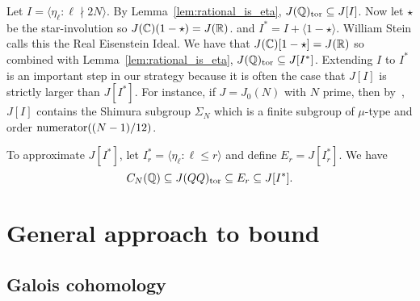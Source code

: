 Let $I= \langle \eta_\ell:\ell\nmid 2N \rangle$. By
Lemma~\ref{lem:rational_is_eta}, $J(\mathbb{Q})_{\mathrm{tor}}\subseteq J[I]$. Now let $\star$
be the star-involution so $J(\mathbb{C})(1-\star)=J(\mathbb{R})$. and $I^*=I +
\langle 1-\star \rangle$. William Stein calls this the Real Eisenstein Ideal.
We have that $J(\mathbb{C})[1-\star]=J(\mathbb{R})$ so combined with
Lemma~\ref{lem:rational_is_eta}, $J(\mathbb{Q})_{\mathrm{tor}}\subseteq J[I^*]$. Extending $I$
to $I^*$ is an important step in our strategy because it is often the case that
$J[I]$ is strictly larger than $J[I^*]$. For instance, if $J=J_0(N)$ with $N$
prime, then by~\cite[Cor. 16.3]{mazur:eisenstein}, $J[I]$ contains the Shimura
subgroup $\Sigma_N$ which is a finite subgroup of $\mu$-type and order
$\operatorname{numerator}((N-1)/12)$.

To approximate $J[I^*]$, let $I_r ^* = \langle \eta_\ell:\ell\leq r \rangle$
and define $E_r = J[I_r ^*]$.
We have
\begin{equation}%
    \label{eq:eta_equation}
    C_N(\QQ)\subseteq J(QQ)_\tor \subseteq E_r \subseteq J[I^*].
\end{equation}

\section{General approach to bound}%
\label{sec:galois_cohomology_bounds}

\subsection{Galois cohomology}%
\label{sub:galois_cohomology}

